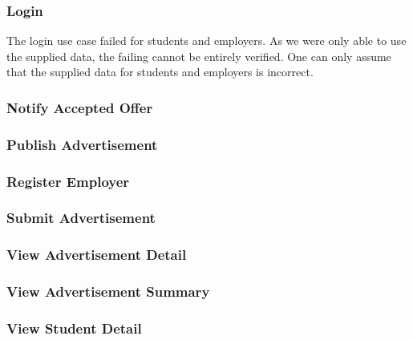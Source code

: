 \documentclass[11pt]{l3deliverable}
\begin{document}
\subsubsection{Login}

The login use case failed for students and employers. As we were only able to
use the supplied data, the failing cannot be entirely verified. One can only
assume that the supplied data for students and employers is incorrect.

\subsubsection{Notify Accepted Offer}

\subsubsection{Publish Advertisement}

\subsubsection{Register Employer}

\subsubsection{Submit Advertisement}

\subsubsection{View Advertisement Detail}

\subsubsection{View Advertisement Summary}

\subsubsection{View Student Detail}
\end{document}
